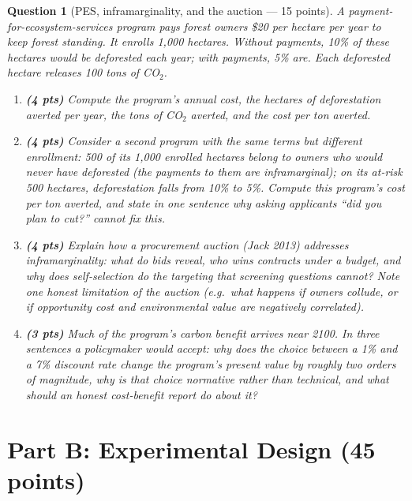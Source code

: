 \documentclass[11pt]{article}
\newtheorem{question}{Question}
\begin{document}
\begin{question}[PES, inframarginality, and the auction --- 15 points]
A payment-for-ecosystem-services program pays forest owners \$20 per
hectare per year to keep forest standing. It enrolls 1{,}000 hectares.
Without payments, 10\% of these hectares would be deforested each year;
with payments, 5\% are. Each deforested hectare releases 100 tons of
CO$_2$.

\begin{enumerate}[label=(\alph*)]
  \item \textbf{(4 pts)} Compute the program's annual cost, the
        hectares of deforestation averted per year, the tons of CO$_2$
        averted, and the cost per ton averted.
  \item \textbf{(4 pts)} Consider a second program with the same terms
        but different enrollment: 500 of its 1{,}000 enrolled hectares
        belong to owners who would never have deforested (the payments
        to them are inframarginal); on its at-risk 500 hectares,
        deforestation falls from 10\% to 5\%. Compute this program's
        cost per ton averted, and state in one sentence why asking
        applicants ``did you plan to cut?'' cannot fix this.
  \item \textbf{(4 pts)} Explain how a procurement auction (Jack 2013)
        addresses inframarginality: what do bids reveal, who wins
        contracts under a budget, and why does self-selection do the
        targeting that screening questions cannot? Note one honest
        limitation of the auction (e.g.\ what happens if owners
        collude, or if opportunity cost and environmental value are
        negatively correlated).
  \item \textbf{(3 pts)} Much of the program's carbon benefit arrives
        near 2100. In three sentences a policymaker would accept: why does
        the choice between a 1\% and a 7\% discount rate change the
        program's present value by roughly two orders of magnitude,
        why is that choice normative rather than technical, and what
        should an honest cost-benefit report do about it?
\end{enumerate}
\end{question}

\section*{Part B: Experimental Design (45 points)}
\end{document}
